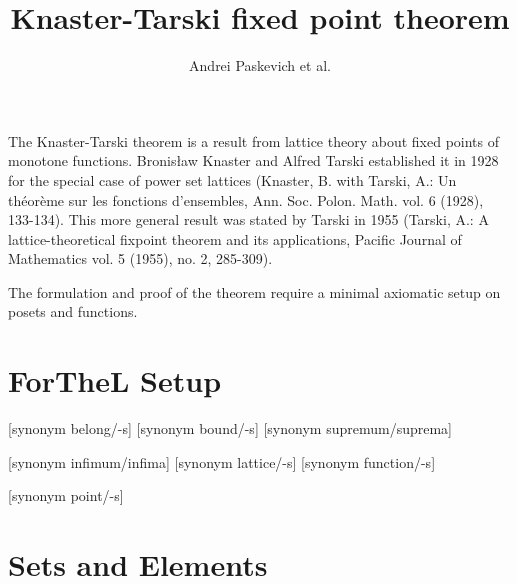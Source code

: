 \documentclass{article}
\title{Knaster-Tarski fixed point theorem}
\author{Andrei Paskevich et al.}
\date{}
\begin{document}

  \maketitle

  The Knaster-Tarski theorem is a result from lattice theory about fixed points of monotone functions.
  Bronis\l aw Knaster and Alfred Tarski established it in 1928 for the special case of power set lattices
  (Knaster, B. with Tarski, A.: Un th\' eor\`eme sur les fonctions d'ensembles, Ann. Soc. Polon. Math.
  vol. 6 (1928), 133-134). This more general result was stated by Tarski in 1955 (Tarski, A.: A lattice-theoretical
  fixpoint theorem and its applications, Pacific Journal of Mathematics vol. 5 (1955), no. 2, 285-309).

  The formulation and proof of the theorem require a minimal axiomatic setup on posets and functions.

  \section{ForTheL Setup}

  \begin{forthel}

    [synonym belong/-s] [synonym bound/-s] [synonym supremum/suprema] 

    [synonym infimum/infima] [synonym lattice/-s] [synonym function/-s]

    [synonym point/-s]
  \end{forthel}

  \section{Sets and Elements}
\end{document}
